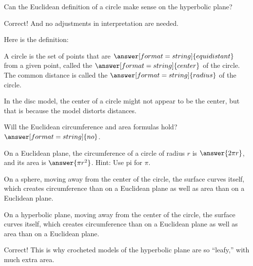 \documentclass{ximera}
\begin{document}
\begin{problem}
Can the Euclidean definition of a circle make sense on the hyperbolic plane?  
\begin{multipleChoice}
\end{multipleChoice}
\begin{problem}
Correct! And no adjustments in interpretation are needed.

Here is the definition:  

A circle is the set of points that are $\answer[format=string]{equidistant}$ from a given point, called the $\answer[format=string]{center}$ of the circle.  The common distance is called the $\answer[format=string]{radius}$ of the circle.  

In the disc model, the center of a circle might not appear to be the center, but that is because the model distorts distances.  

\begin{problem}
Will the Euclidean circumference and area formulas hold?  
$\answer[format=string]{no}$. 
\begin{problem}
On a Euclidean plane, the circumference of a circle of radius $r$ is $\answer{2\pi r}$, and its area is $\answer{\pi r^2}$.  Hint: Use pi for $\pi$. 

On a sphere, moving away from the center of the circle, the surface curves  itself, which creates  circumference than on a Euclidean plane as well as  area than on a Euclidean plane.  

On a hyperbolic plane, moving away from the center of the circle, the surface curves  itself, which creates  circumference than on a Euclidean plane as well as  area than on a Euclidean plane.  
\begin{problem}
Correct!  This is why crocheted models of the hyperbolic plane are so ``leafy,'' with much extra area.  
\end{problem}

\end{problem}
\end{problem}
\end{problem}
\end{problem}
\end{document}

